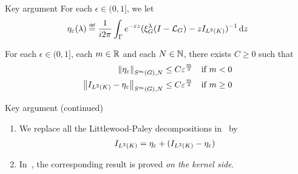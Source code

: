 \documentclass[handout]{beamer}
\begin{document}
\begin{frame}{Key argument}
    For each $\epsilon \in (0, 1]$,
    we let
    \begin{align*}
        \eta_\epsilon(\lambda)
        \defeq
        \frac 1 {\i \turn}
        \int_\Gamma
        \e^{-\epsilon z}
        (\Rep \lambda \BesselPotentialSquared {} - z \Id {\Lebesgue 2 \CompactGroup})^{-1}
        \dd z
    \end{align*}

    \pause

    \begin{theorem}
        For each $\epsilon \in (0, 1]$, each $m \in \R$ and each $N \in \N$,
        there exists $C \geq 0$ such that
        \begin{align*}
                \SymbolSemiNorm m {} N {\eta_\epsilon}
                &\leq C \epsilon^\frac m 2
                & \text{if } m < 0\\
                \SymbolSemiNorm m {} N {\Id {\Lebesgue 2 \CompactGroup} - \eta_\epsilon}
                &\leq C \epsilon^\frac m 2
                & \text{if } m \geq 0
        \end{align*}
    \end{theorem}
\end{frame}

\begin{frame}{Key argument (continued)}
    \begin{enumerate}
        \item
            We replace all the Littlewood-Paley decompositions in~\cite{Fischer2015,FischerRuzhansky16} by
            \begin{align*}
                \Id {\Lebesgue 2 \CompactGroup}
                =
                \eta_\epsilon +
                (\Id {\Lebesgue 2 \CompactGroup} - \eta_\epsilon)
            \end{align*}
        \item
            In~\cite{FischerRuzhansky16,Fischer2015},
            the corresponding result is proved \emph{on the kernel side}.
    \end{enumerate}
\end{frame}
\end{document}
